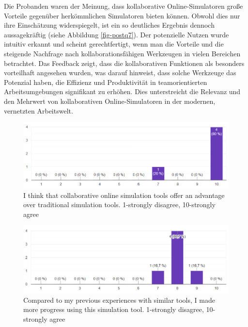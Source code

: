 \documentclass[german,version-2020-11]{uzl-thesis}
\begin{document}
  Die Probanden waren der Meinung, dass kollaborative Online-Simulatoren große Vorteile gegenüber herkömmlichen Simulatoren bieten können. 
  Obwohl dies nur ihre Einschätzung widerspiegelt, ist ein so deutliches Ergebnis dennoch aussagekräftig (siehe Abbildung \vref{fig-postq7}). 
  Der potenzielle Nutzen wurde intuitiv erkannt und scheint gerechtfertigt, wenn man die Vorteile und die steigende Nachfrage nach kollaborationsfähigen Werkzeugen in vielen Bereichen betrachtet.
  Das Feedback zeigt, dass die kollaborativen Funktionen als besonders vorteilhaft angesehen wurden, 
  was darauf hinweist, dass solche Werkzeuge das Potenzial haben, die Effizienz und Produktivität in teamorientierten Arbeitsumgebungen signifikant zu erhöhen. 
  Dies unterstreicht die Relevanz und den Mehrwert von kollaborativen Online-Simulatoren in der modernen, vernetzten Arbeitswelt.

  \begin{figure}[htpb]
    \centering
    \includegraphics[scale=0.8]{figures/post_question7.png}
    \caption{I think that collaborative online simulation tools offer an advantage over traditional simulation tools. 1-strongly disagree, 10-strongly agree }
    \label{fig-postq7}
  \end{figure}
  
  \begin{figure}[htpb]
    \centering
    \includegraphics[scale=0.8]{figures/post_question8.png}
    \caption{Compared to my previous experiences with similar tools, I made more progress using this simulation tool. 1-strongly disagree, 10-strongly agree }
    \label{fig-postq8}
  \end{figure}
  
\end{document}
